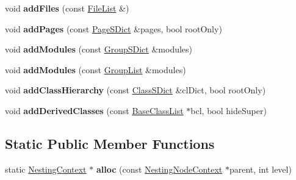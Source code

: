 \begin{DoxyCompactItemize}
\item 
\mbox{\label{class_nesting_context_a9c2b94e274f88aa43230b3de7f7a1602}} 
void {\bfseries add\+Files} (const \mbox{\hyperlink{class_file_list}{File\+List}} \&)
\item 
\mbox{\label{class_nesting_context_a0b561031193905299f81f1f42bbd7d2f}} 
void {\bfseries add\+Pages} (const \mbox{\hyperlink{class_page_s_dict}{Page\+S\+Dict}} \&pages, bool root\+Only)
\item 
\mbox{\label{class_nesting_context_aa5f09a9e6d48406b9bb06b1d9a603c3c}} 
void {\bfseries add\+Modules} (const \mbox{\hyperlink{class_group_s_dict}{Group\+S\+Dict}} \&modules)
\item 
\mbox{\label{class_nesting_context_a671e6a557f74d6c37e0dc441644b9eea}} 
void {\bfseries add\+Modules} (const \mbox{\hyperlink{class_group_list}{Group\+List}} \&modules)
\item 
\mbox{\label{class_nesting_context_a626b0bfd1cae233e80a32bba17299a0e}} 
void {\bfseries add\+Class\+Hierarchy} (const \mbox{\hyperlink{class_class_s_dict}{Class\+S\+Dict}} \&cl\+Dict, bool root\+Only)
\item 
\mbox{\label{class_nesting_context_a420f6c00ef503715ea4127909c492630}} 
void {\bfseries add\+Derived\+Classes} (const \mbox{\hyperlink{class_base_class_list}{Base\+Class\+List}} $\ast$bcl, bool hide\+Super)
\end{DoxyCompactItemize}
\subsection*{Static Public Member Functions}
\begin{DoxyCompactItemize}
\item 
\mbox{\label{class_nesting_context_af781c93a616e539e857a135aa97a09cc}} 
static \mbox{\hyperlink{class_nesting_context}{Nesting\+Context}} $\ast$ {\bfseries alloc} (const \mbox{\hyperlink{class_nesting_node_context}{Nesting\+Node\+Context}} $\ast$parent, int level)
\end{DoxyCompactItemize}


